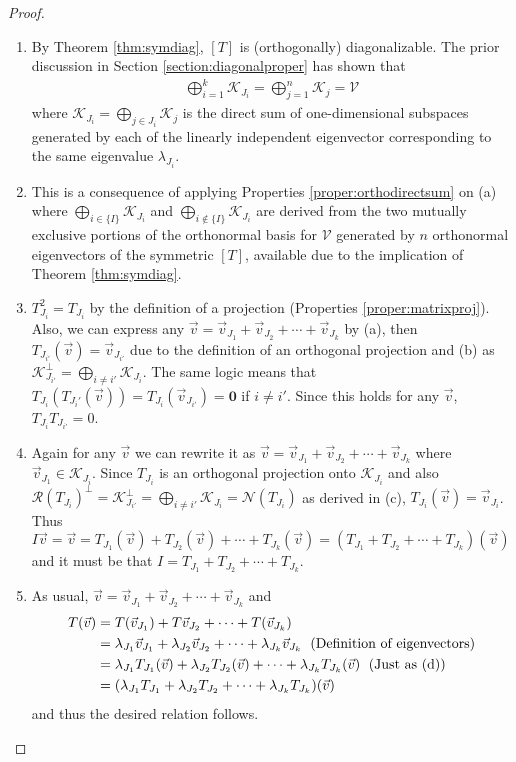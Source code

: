 \begin{proof}
\begin{enumerate}[label=(\alph*)]  
\item By Theorem \ref{thm:symdiag}, $[T]$ is (orthogonally) diagonalizable. The prior discussion in Section \ref{section:diagonalproper} has shown that
\begin{align*}
\bigoplus_{i=1}^{k} \mathcal{K}_{J_i} = \bigoplus_{j=1}^n \mathcal{K}_j = \mathcal{V}    
\end{align*}
where $\mathcal{K}_{J_i} = \bigoplus_{j \in J_i} \mathcal{K}_j$ is the direct sum of one-dimensional subspaces generated by each of the linearly independent eigenvector corresponding to the same eigenvalue $\lambda_{J_i}$.
\item This is a consequence of applying Properties \ref{proper:orthodirectsum} on (a) where $\bigoplus_{i \in \{I\}} \mathcal{K}_{J_i}$ and $\bigoplus_{i \notin \{I\}} \mathcal{K}_{J_i}$ are derived from the two mutually exclusive portions of the orthonormal basis for $\mathcal{V}$ generated by $n$ orthonormal eigenvectors of the symmetric $[T]$, available due to the implication of Theorem \ref{thm:symdiag}.
\item $T_{J_i}^2 = T_{J_i}$ by the definition of a projection (Properties \ref{proper:matrixproj}). Also, we can express any $\vec{v} = \vec{v}_{J_1} + \vec{v}_{J_2} + \cdots + \vec{v}_{J_k}$ by (a), then $T_{J_{i'}}(\vec{v}) = \vec{v}_{J_{i'}}$ due to the definition of an orthogonal projection and (b) as $\mathcal{K}_{J_{i'}}^\perp = \bigoplus_{i \neq i'} \mathcal{K}_{J_i}$. The same logic means that $T_{J_i}(T_{J_i'}(\vec{v})) = T_{J_i}(\vec{v}_{J_{i'}}) = \textbf{0}$ if $i \neq i'$. Since this holds for any $\vec{v}$, $T_{J_i} T_{J_{i'}} = 0$.
\item Again for any $\vec{v}$ we can rewrite it as $\vec{v} = \vec{v}_{J_1} + \vec{v}_{J_2} + \cdots + \vec{v}_{J_k}$ where $\vec{v}_{J_1} \in \mathcal{K}_{J_i}$. Since $T_{J_i}$ is an orthogonal projection onto $\mathcal{K}_{J_i}$ and also $\mathcal{R}(T_{J_i})^\perp = \mathcal{K}_{J_{i'}}^\perp = \bigoplus_{i \neq i'} \mathcal{K}_{J_i} = \mathcal{N}(T_{J_i})$ as derived in (c), $T_{J_i}(\vec{v}) = \vec{v}_{J_i}$. Thus $I\vec{v} = \vec{v} = T_{J_1}(\vec{v}) + T_{J_2}(\vec{v}) + \cdots + T_{J_k}(\vec{v}) = (T_{J_1} + T_{J_2} + \cdots + T_{J_k})(\vec{v})$ and it must be that $I = T_{J_1} + T_{J_2} + \cdots + T_{J_k}$.
\item As usual, $\vec{v} = \vec{v}_{J_1} + \vec{v}_{J_2} + \cdots + \vec{v}_{J_k}$ and
\begin{align*}
T(\vec{v}) &= T(\vec{v}_{J_1}) + T\vec{v}_{J_2} + \cdots + T(\vec{v}_{J_k}) \\
&= \lambda_{J_1}\vec{v}_{J_1} + \lambda_{J_2}\vec{v}_{J_2} + \cdots + \lambda_{J_k}\vec{v}_{J_k} \text{\; (Definition of eigenvectors)} \\
&= \lambda_{J_1}T_{J_1}(\vec{v}) + \lambda_{J_2}T_{J_2}(\vec{v}) + \cdots + \lambda_{J_k}T_{J_k}(\vec{v}) \text{\; (Just as (d))} \\
&= (\lambda_{J_1}T_{J_1} + \lambda_{J_2}T_{J_2} + \cdots + \lambda_{J_k}T_{J_k})(\vec{v})
\end{align*}
and thus the desired relation follows.
\end{enumerate}
\end{proof}
